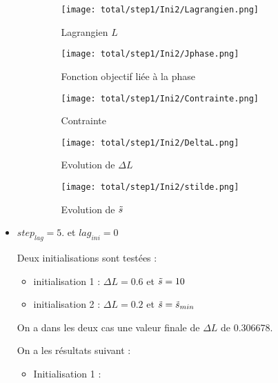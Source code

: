 \documentclass[11pt,a4paper]{article}
\begin{document}
\begin{itemize}
\begin{itemize}
		\begin{figure}[H]
			\begin{minipage}{0.33\textwidth}
				\centering
				\texttt{[image: total/step1/Ini2/Lagrangien.png]}
				\caption{Lagrangien $L$}
			\end{minipage}
			\begin{minipage}{0.33\textwidth}
				\centering
				\texttt{[image: total/step1/Ini2/Jphase.png]}
				\caption{Fonction objectif liée à la phase}
			\end{minipage}
			\begin{minipage}{0.33\textwidth}
				\centering
				\texttt{[image: total/step1/Ini2/Contrainte.png]}
				\caption{Contrainte}
			\end{minipage}
		\end{figure}
		
		\begin{figure}[H]
			\begin{minipage}{0.45\textwidth}
				\centering
				\texttt{[image: total/step1/Ini2/DeltaL.png]}
				\caption{Evolution de $\Delta L$}
			\end{minipage}
			\begin{minipage}{0.45\textwidth}
				\centering
				\texttt{[image: total/step1/Ini2/stilde.png]}
				\caption{Evolution de $\tilde{s}$}
			\end{minipage}
		\end{figure}
		
	\end{itemize}
	
	
	\item $step_{lag}=5.$ et $lag_{ini}=0$ 
	
	
	Deux initialisations sont testées :
	\begin{itemize}
		\item initialisation 1 : $\Delta L=0.6$ et $\tilde{s}=10$
		\item initialisation 2 : $\Delta L=0.2$ et $\tilde{s}=\tilde{s}_{min}$
	\end{itemize}
	On a dans les deux cas une valeur finale de $\Delta L$ de 0.306678. 
	
	\vspace{0cm}
	
	On a les résultats suivant :
	
	\begin{itemize}
		\item Initialisation 1 :
		

\end{itemize}
\end{itemize}
\end{document}
